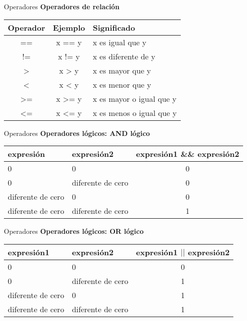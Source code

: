 \begin{frame}[t]{Operadores}
\textbf{Operadores de relación}\\ \vspace{5mm}
\begin{center}
\begin{tabular}{ccl}
	\toprule
	\textbf{Operador} & \textbf{Ejemplo} & \textbf{Significado}\\
	\midrule
	== & x == y & x es igual que y \\ \hline
	!= & x != y & x es diferente de y \\ \hline
	> & x > y & x es mayor que y \\ \hline
	< & x < y & x es menor que y \\ \hline
	>= & x >= y & x es mayor o igual que y \\ \hline
	<= & x <= y & x es menos o igual que y \\ 
	\bottomrule
\end{tabular}
\end{center}
\end{frame}

\begin{frame}[t]{Operadores}
\textbf{Operadores lógicos: AND lógico}\\ \vspace{3mm}
\begin{center}
\begin{tabular}{llc}
	\toprule
	\textbf{expresión} & \textbf{expresión2} & \textbf{expresión1 \&\& expresión2}\\
	\midrule \hline
	0 & 0 & 0 \\
	0 & diferente de cero & 0\\
	diferente de cero & 0 & 0\\
	diferente de cero & diferente de cero & 1\\ \hline
	\bottomrule
\end{tabular}
\end{center}
\end{frame}

\begin{frame}[t]{Operadores}
\textbf{Operadores lógicos: OR lógico}\\ \vspace{5mm}
\centering
\begin{tabular}{llc}
	\toprule
	\textbf{expresión1} & \textbf{expresión2} & \textbf{expresión1 $| |$ expresión2}\\
	\midrule \hline
	0 & 0 & 0 \\
	0 & diferente de cero & 1\\
	diferente de cero & 0 & 1\\
	diferente de cero & diferente de cero & 1\\ \hline
	\bottomrule
\end{tabular}
\end{frame}


